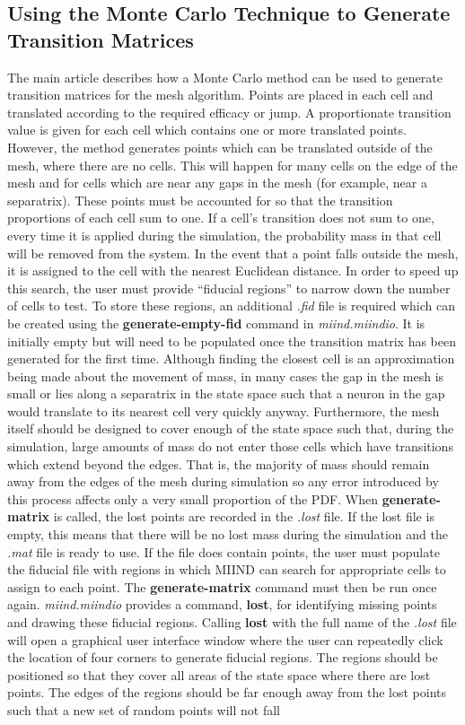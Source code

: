 \documentclass[utf8]{frontiers_suppmat} %
\begin{document}
\subsection{Using the Monte Carlo Technique to Generate Transition Matrices}
\label{suppl:montecarlo}
The main article describes how a Monte Carlo method can be used to generate transition matrices for the mesh algorithm. Points are placed in each cell and translated according to the required efficacy or jump. A proportionate transition value is given for each cell which contains one or more translated points. However, the method generates points which can be translated outside of the mesh, where there are no cells. This will happen for many cells on the edge of the mesh and for cells which are near any gaps in the mesh (for example, near a separatrix). These points must be accounted for so that the transition proportions of each cell sum to one. If a cell's transition does not sum to one, every time it is applied during the simulation, the probability mass in that cell will be removed from the system. In the event that a point falls outside the mesh, it is assigned to the cell with the nearest Euclidean distance. In order to speed up this search, the user must provide ``fiducial regions'' to narrow down the number of cells to test. To store these regions, an additional \textit{.fid} file is required which can be created using the \textbf{generate-empty-fid} command in \textit{miind.miindio}. It is initially empty but will need to be populated once the transition matrix has been generated for the first time. Although finding the closest cell is an approximation being made about the movement of mass, in many cases the gap in the mesh is small or lies along a separatrix in the state space such that a neuron in the gap would translate to its nearest cell very quickly anyway. Furthermore, the mesh itself should be designed to cover enough of the state space such that, during the simulation, large amounts of mass do not enter those cells which have transitions which extend beyond the edges. That is, the majority of mass should remain away from the edges of the mesh during simulation so any error introduced by this process affects only a very small proportion of the PDF. When \textbf{generate-matrix} is called, the lost points are recorded in the \textit{.lost} file. If the lost file is empty, this means that there will be no lost mass during the simulation and the \textit{.mat} file is ready to use. If the file does contain points, the user must populate the fiducial file with regions in which MIIND can search for appropriate cells to assign to each point. The \textbf{generate-matrix} command must then be run once again. \textit{miind.miindio} provides a command, \textbf{lost}, for identifying missing points and drawing these fiducial regions. Calling \textbf{lost} with the full name of the \textit{.lost} file will open a graphical user interface window where the user can repeatedly click the location of four corners to generate fiducial regions. The regions should be positioned so that they cover all areas of the state space where there are lost points. The edges of the regions should be far enough away from the lost points such that a new set of random points will not fall 
\end{document}
